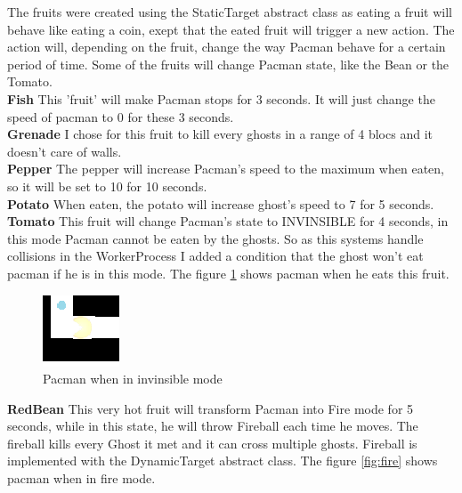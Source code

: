 \documentclass[]{article}
\begin{document}
The fruits were created using the StaticTarget abstract class as eating a fruit will behave like eating a coin, exept that the eated fruit will trigger a new action. The action will, depending on the fruit, change the way Pacman behave for a certain period of time. Some of the fruits will change Pacman state, like the Bean or the Tomato. \\

\textbf{Fish}  This 'fruit' will make Pacman stops for 3 seconds. It will just change the speed of pacman to 0 for these 3 seconds. \\

\textbf{Grenade} I chose for this fruit to kill every ghosts in a range of 4 blocs and it doesn't care of walls. \\

\textbf{Pepper} The pepper will increase Pacman's speed to the maximum when eaten, so it will be set to 10 for 10 seconds. \\

\textbf{Potato} When eaten, the potato will increase ghost's speed to 7 for 5 seconds. \\

\textbf{Tomato} This fruit will change Pacman's state to INVINSIBLE for 4 seconds, in this mode Pacman cannot be eaten by the ghosts. So as this systems handle collisions in the WorkerProcess I added a condition that the ghost won't eat pacman if he is in this mode. The figure \ref{fig:invisible} shows pacman when he eats this fruit. \\

\begin{figure}[h!]
\centering
\includegraphics[width=0.2\linewidth]{invisible.png}
\caption{Pacman when in invinsible mode}
\label{fig:invisible}
\end{figure}

\textbf{RedBean} This very hot fruit will transform Pacman into Fire mode for 5 seconds, while in this state, he will throw Fireball each time he moves. The fireball kills every Ghost it met and it can cross multiple ghosts. Fireball is implemented with the DynamicTarget abstract class. The figure \ref{fig:fire} shows pacman when in fire mode. \\
\end{document}
